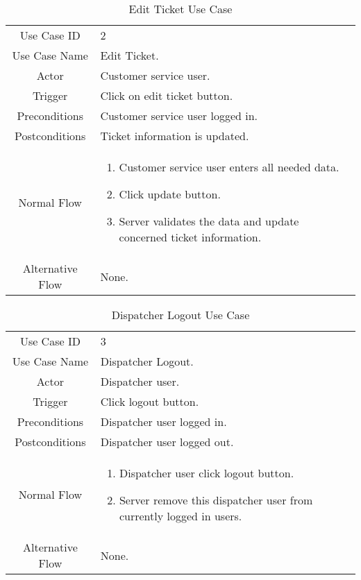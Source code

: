 	\begin{table}[H]
		\centering
		\renewcommand{\arraystretch}{1.5}
		\begin{tabular}[t]{ c  m{10cm} }
			Use Case ID & 2  \\
			Use Case Name & Edit Ticket. \\
			Actor & Customer service user. \\
			Trigger & Click on edit ticket button. \\
			Preconditions & Customer service user logged in. \\
			Postconditions & Ticket information is updated. \\
			Normal Flow &\begin{enumerate}
				\item Customer service user enters all needed data.
				\item Click update button.
				\item Server validates the data and update concerned ticket information.
			\end{enumerate}\\
			Alternative Flow & None. \\
		\end{tabular}
		\caption{Edit Ticket Use Case}
		\renewcommand{\arraystretch}{1.0}
	\end{table}
	
	\begin{table}[H]
		\centering
		\renewcommand{\arraystretch}{1.5}
		\begin{tabular}[t]{ c  m{10cm} }
			Use Case ID & 3  \\
			Use Case Name & Dispatcher Logout. \\
			Actor & Dispatcher user. \\
			Trigger & Click logout button. \\
			Preconditions & Dispatcher user logged in. \\
			Postconditions & Dispatcher user logged out. \\
			Normal Flow &\begin{enumerate}
				\item Dispatcher user click logout button.
				\item Server remove this dispatcher user from currently logged in users.
			\end{enumerate}\\
			Alternative Flow & None. \\
		\end{tabular}
		\caption{Dispatcher Logout Use Case}
		\renewcommand{\arraystretch}{1.0}
	\end{table}
	

